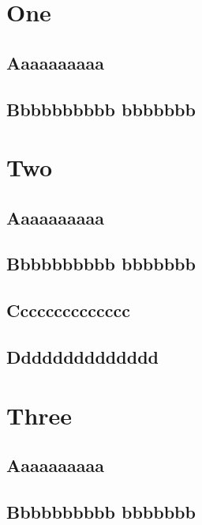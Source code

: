 \chapter{One}
\lipsum
\section{Aaaaaaaaaa}
\lipsum
\section{Bbbbbbbbbb bbbbbbb}
\lipsum
\chapter{Two}
\section{Aaaaaaaaaa}
\lipsum
\section{Bbbbbbbbbb bbbbbbb}
\lipsum
\section{Cccccccccccccc}
\lipsum
\section{Dddddddddddddd}
\lipsum
\appendix
\chapter{Three}
\section{Aaaaaaaaaa}
\lipsum
\section{Bbbbbbbbbb bbbbbbb}
\lipsum
